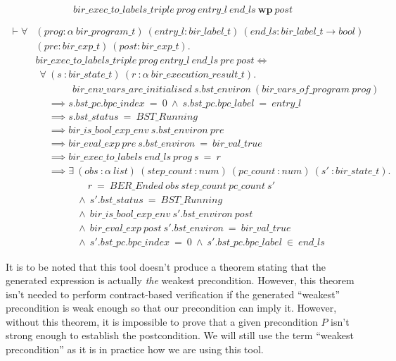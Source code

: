 \documentclass{kththesis}
\begin{document}
{\begin{equation}
    bir\_exec\_to\_labels\_triple~prog~entry\_l~end\_ls~\mathbf{wp}~post
    \label{triple_wp_thm}
\end{equation}

\begin{small}
\begin{equation}
\begin{split}
    \vdash \forall &(prog :\alpha~bir\_program\_t)~(entry\_l :bir\_label\_t)%
    ~(end\_ls :bir\_label\_t \rightarrow bool)\\
    & (pre :bir\_exp\_t)~(post :bir\_exp\_t).\\
    & bir\_exec\_to\_labels\_triple~prog~entry\_l~end\_ls~pre~post \Leftrightarrow\\
    & ~~\forall~(s~:bir\_state\_t)~(r~:\alpha~bir\_execution\_result\_t).\\
    & ~~~~~~~~~~~~~~~~~bir\_env\_vars\_are\_initialised~s.bst\_environ~(bir\_vars\_of\_program~prog)\\
    & ~~~~~~\implies s.bst\_pc.bpc\_index~=~0~\land~s.bst\_pc.bpc\_label~=~entry\_l\\
    & ~~~~~~\implies s.bst\_status~=~BST\_Running\\
    & ~~~~~~\implies bir\_is\_bool\_exp\_env~s.bst\_environ~pre\\
    & ~~~~~~\implies bir\_eval\_exp~pre~s.bst\_environ~=~bir\_val\_true\\
    & ~~~~~~\implies bir\_exec\_to\_labels~end\_ls~prog~s~=~r\\
    & ~~~~~~\implies \exists~(obs~:\alpha~list)~(step\_count~:num)%
    ~(pc\_count~:num)~(s'~:bir\_state\_t).\\
    & ~~~~~~~~~~~~~~~~~~~~~~~~r~=~BER\_Ended~obs~step\_count~pc\_count~s'\\
    & ~~~~~~~~~~~~~~~~~~~\land~s'.bst\_status~=~BST\_Running\\
    & ~~~~~~~~~~~~~~~~~~~\land~bir\_is\_bool\_exp\_env~s'.bst\_environ~post\\
    & ~~~~~~~~~~~~~~~~~~~\land~bir\_eval\_exp~post~s'.bst\_environ~=~bir\_val\_true\\
    & ~~~~~~~~~~~~~~~~~~~\land~s'.bst\_pc.bpc\_index~=~0~\land~s'.bst\_pc.bpc\_label~\in~end\_ls
\end{split}
\label{holba_wp_ht_thm}
\end{equation}
\end{small}

It is to be noted that this tool doesn't produce a theorem stating that the generated expression is actually \textit{the} weakest precondition. However, this theorem isn't needed to perform contract-based verification if the generated ``weakest'' precondition is weak enough so that our precondition can imply it. However, without this theorem, it is impossible to prove that a given precondition $P$ isn't strong enough to establish the postcondition. We will still use the term ``weakest precondition'' as it is in practice how we are using this tool.

}
\end{document}
